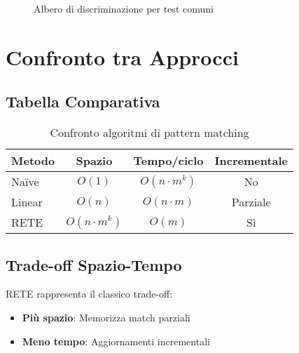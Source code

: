 \begin{figure}[h]
\centering
{}
\caption{Albero di discriminazione per test comuni}
\label{fig:discriminazione}
\end{figure}

\section{Confronto tra Approcci}

\subsection{Tabella Comparativa}

\begin{table}[h]
\centering
\begin{tabular}{@{}lccc@{}}
\toprule
\textbf{Metodo} & \textbf{Spazio} & \textbf{Tempo/ciclo} & \textbf{Incrementale} \\
\midrule
Naïve & $O(1)$ & $O(n \cdot m^k)$ & No \\
Linear & $O(n)$ & $O(n \cdot m)$ & Parziale \\
RETE & $O(n \cdot m^k)$ & $O(m)$ & Sì \\
\bottomrule
\end{tabular}
\caption{Confronto algoritmi di pattern matching}
\label{tab:confronto_matching}
\end{table}

\subsection{Trade-off Spazio-Tempo}

RETE rappresenta il classico trade-off:
\begin{itemize}
\item \textbf{Più spazio}: Memorizza match parziali
\item \textbf{Meno tempo}: Aggiornamenti incrementali
\end{itemize}

